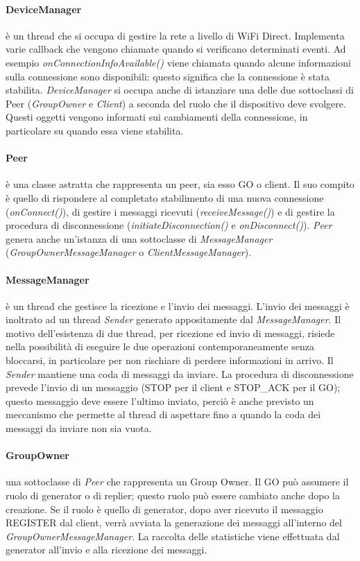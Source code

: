 \documentclass{llncs}
\begin{document}
\paragraph{DeviceManager} è un thread che si occupa di gestire la rete a livello di WiFi Direct. Implementa varie callback che vengono chiamate quando si verificano determinati eventi.
Ad esempio \emph{onConnectionInfoAvailable()} viene chiamata quando alcune informazioni sulla connessione sono disponibili: questo significa che la connessione è stata stabilita.
\emph{DeviceManager} si occupa anche di istanziare una delle due sottoclassi di Peer (\emph{GroupOwner} e \emph{Client}) a seconda del ruolo che il dispositivo deve svolgere. Questi oggetti vengono informati sui cambiamenti della connessione, in particolare su quando essa viene stabilita.

\paragraph{Peer} è una classe astratta che rappresenta un peer, sia esso GO o client. Il suo compito è quello di rispondere al completato stabilimento di una nuova connessione (\emph{onConnect()}), 
di gestire i messaggi ricevuti (\emph{receiveMessage()}) e di gestire la procedura di disconnessione (\emph{initiateDisconnection()} e \emph{onDisconnect()}). 
\emph{Peer} genera anche un'istanza di una sottoclasse di \emph{MessageManager} (\emph{GroupOwnerMessageManager} o \emph{ClientMessageManager}).

\paragraph{MessageManager} è un thread che gestisce la ricezione e l'invio dei messaggi. L'invio dei messaggi è inoltrato ad un thread \emph{Sender} generato appositamente dal \emph{MessageManager}. Il motivo dell'esistenza di due thread, per ricezione ed invio di messaggi, risiede nella possibilità di eseguire le due operazioni contemporaneamente senza bloccarsi, in particolare per non rischiare di perdere informazioni in arrivo. Il \emph{Sender} mantiene 
una coda di messaggi da inviare. La procedura di disconnessione prevede l'invio di un messaggio (STOP per il client e STOP\_ACK per il GO); questo messaggio deve essere l'ultimo inviato, perciò è anche previsto un meccanismo che 
permette al thread di aspettare fino a quando la coda dei messaggi da inviare non sia vuota.

\paragraph{GroupOwner} una sottoclasse di \emph{Peer} che rappresenta un Group Owner. Il GO può assumere il ruolo di generator o di replier; questo ruolo può essere cambiato anche dopo la creazione. Se il ruolo è quello di generator, 
dopo aver ricevuto il messaggio REGISTER dal client, verrà avviata la generazione dei messaggi all'interno del \emph{GroupOwnerMessageManager}. La raccolta delle statistiche viene effettuata dal generator all'invio e alla ricezione dei messaggi.
\end{document}
